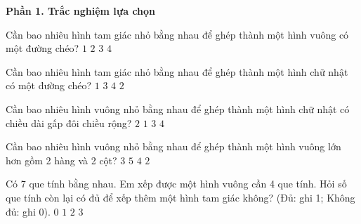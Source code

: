 \textbf{Phần 1. Trắc nghiệm lựa chọn}

\begin{ex} %
Cần bao nhiêu hình tam giác nhỏ bằng nhau để ghép thành một hình vuông có một đường chéo?
\choice
{$1$}
{\True $2$}
{$3$}
{$4$}
\end{ex}

\begin{ex} %
Cần bao nhiêu hình tam giác nhỏ bằng nhau để ghép thành một hình chữ nhật có một đường chéo?
\choice
{$1$}
{$3$}
{$4$}
{\True $2$}
\end{ex}

\begin{ex} %
Cần bao nhiêu hình vuông nhỏ bằng nhau để ghép thành một hình chữ nhật có chiều dài gấp đôi chiều rộng?
\choice
{\True $2$}
{$1$}
{$3$}
{$4$}
\end{ex}

\begin{ex} %
Cần bao nhiêu hình vuông nhỏ bằng nhau để ghép thành một hình vuông lớn hơn gồm 2 hàng và 2 cột?
\choice
{$3$}
{$5$}
{\True $4$}
{$2$}
\end{ex}

\begin{ex} %
Có 7 que tính bằng nhau. Em xếp được một hình vuông cần 4 que tính. Hỏi số que tính còn lại có đủ để xếp thêm một hình tam giác không? (Đủ: ghi 1; Không đủ: ghi 0).
\choice
{$0$}
{\True $1$}
{$2$}
{$3$}
\end{ex}

